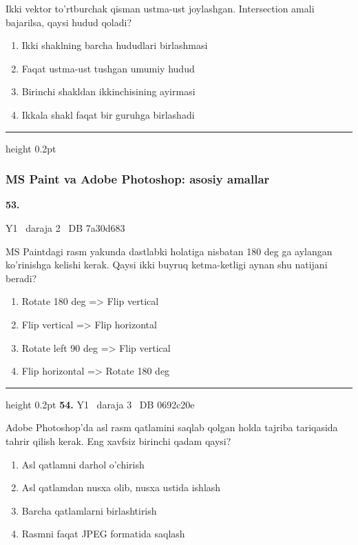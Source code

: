 \documentclass[10pt,a4paper,oneside]{article}
\begin{document}
\par
Ikki vektor to'rtburchak qisman ustma-ust joylashgan. Intersection amali bajarilsa, qaysi hudud qoladi?
\begin{enumerate}[label=\Alph*),leftmargin=9mm]
\item Ikki shaklning barcha hududlari birlashmasi
\item Faqat ustma-ust tushgan umumiy hudud
\item Birinchi shakldan ikkinchisining ayirmasi
\item Ikkala shakl faqat bir guruhga birlashadi
\end{enumerate}
\vspace{2mm}\hrule height 0.2pt \vspace{4mm}
\subsubsection{MS Paint va Adobe Photoshop: asosiy amallar}
\hypertarget{q53}{\textbf{\color{ink}53.}}  {\color{muted}\scriptsize Y1 \textbullet\ daraja 2 \textbullet\ DB 7a30d683}
\par
MS Paintdagi rasm yakunda dastlabki holatiga nisbatan 180 deg  ga aylangan ko'rinishga kelishi kerak. Qaysi ikki buyruq ketma-ketligi aynan shu natijani beradi?
\begin{enumerate}[label=\Alph*),leftmargin=9mm]
\item Rotate 180 deg  =\textgreater{} Flip vertical
\item Flip vertical =\textgreater{} Flip horizontal
\item Rotate left 90 deg  =\textgreater{} Flip vertical
\item Flip horizontal =\textgreater{} Rotate 180 deg 
\end{enumerate}
\vspace{2mm}\hrule height 0.2pt \vspace{4mm}
\hypertarget{q54}{\textbf{\color{ink}54.}}  {\color{muted}\scriptsize Y1 \textbullet\ daraja 3 \textbullet\ DB 0692c20e}
\par
Adobe Photoshop'da asl rasm qatlamini saqlab qolgan holda tajriba tariqasida tahrir qilish kerak. Eng xavfsiz birinchi qadam qaysi?
\begin{enumerate}[label=\Alph*),leftmargin=9mm]
\item Asl qatlamni darhol o'chirish
\item Asl qatlamdan nusxa olib, nusxa ustida ishlash
\item Barcha qatlamlarni birlashtirish
\item Rasmni faqat JPEG formatida saqlash
\end{enumerate}
\end{document}
